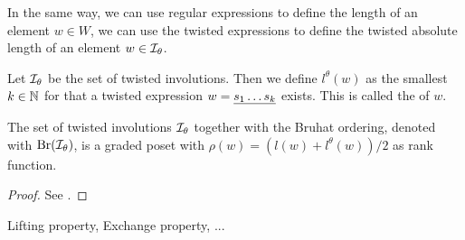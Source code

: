 In the same way, we can use regular expressions to define the length of an element $w \in W$, we can use the twisted expressions to define the twisted absolute length of an element $w \in \mathcal{I}_{\theta}$.

\begin{defi}
	Let $\mathcal{I}_{\theta}$ be the set of twisted involutions. Then we define $l^\theta(w)$ as the smallest $k \in \mathbb{N}$ for that a twisted expression $w = \underline{s_1 \ldots s_k}$ exists. This is called the  of $w$.
\end{defi}

\begin{lemm}
	The set of twisted involutions $\mathcal{I}_{\theta}$ together with the Bruhat ordering, denoted with $\operatorname{Br}(\mathcal{I}_{\theta})$, is a graded poset with $\rho(w) = (l(w) + l^\theta(w))/2$ as rank function.

	\begin{proof}
		See \cite[Theorem 4.8]{hultman:bruhat-order}.
	\end{proof}
\end{lemm}

\todo Lifting property, Exchange property, ...